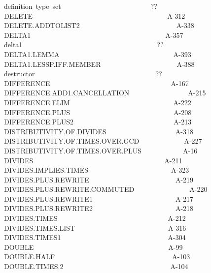 \documentclass[11pt]{book}
\newenvironment{pubasis}{\begin{flushleft}\ttfamily\small}{\normalsize\rmfamily\end{flushleft}}
\begin{document}
\begin{pubasis}
definition~type~set~~~~~~~~~~~~~~~~~~~~~~~~~~??\\
DELETE~~~~~~~~~~~~~~~~~~~~~~~~~~~~~~~~~~~~~~~A-312\\
DELETE.ADD\-TO\-LIST2~~~~~~~~~~~~~~~~~~~~~~~~~~~~A-338\\
DELTA1~~~~~~~~~~~~~~~~~~~~~~~~~~~~~~~~~~~~~~~A-357\\
delta1~~~~~~~~~~~~~~~~~~~~~~~~~~~~~~~~~~~~~~~??\\
DELTA1.LEMMA~~~~~~~~~~~~~~~~~~~~~~~~~~~~~~~~~A-393\\
DELTA1.LESSP.IFF.MEMBER~~~~~~~~~~~~~~~~~~~~~~A-388\\
destructor~~~~~~~~~~~~~~~~~~~~~~~~~~~~~~~~~~~??\\
DIFFERENCE~~~~~~~~~~~~~~~~~~~~~~~~~~~~~~~~~~~A-167\\
DIF\-FER\-ENCE.ADD1.CAN\-CELLATION~~~~~~~~~~~~~~~~~A-215\\
DIF\-FER\-ENCE.ELIM~~~~~~~~~~~~~~~~~~~~~~~~~~~~~~A-222\\
DIF\-FER\-ENCE.PLUS~~~~~~~~~~~~~~~~~~~~~~~~~~~~~~A-208\\
DIF\-FER\-ENCE.PLUS2~~~~~~~~~~~~~~~~~~~~~~~~~~~~~A-213\\
DIS\-TRI\-BU\-TIV\-ITY.OF.DIVIDES~~~~~~~~~~~~~~~~~~~~A-318\\
DIS\-TRI\-BU\-TIV\-ITY.OF.TIMES.OVER.GCD~~~~~~~~~~~~~A-227\\
DIS\-TRI\-BU\-TIV\-ITY.OF.TIMES.OVER.PLUS~~~~~~~~~~~~A-16\\
DIVIDES~~~~~~~~~~~~~~~~~~~~~~~~~~~~~~~~~~~~~~A-211\\
DIVIDES.IMPLIES.TIMES~~~~~~~~~~~~~~~~~~~~~~~~A-323\\
DIVIDES.PLUS.REWRITE~~~~~~~~~~~~~~~~~~~~~~~~~A-219\\
DIVIDES.PLUS.REWRITE.COMMUTED~~~~~~~~~~~~~~~~A-220\\
DIVIDES.PLUS.REWRITE1~~~~~~~~~~~~~~~~~~~~~~~~A-217\\
DIVIDES.PLUS.REWRITE2~~~~~~~~~~~~~~~~~~~~~~~~A-218\\
DIVIDES.TIMES~~~~~~~~~~~~~~~~~~~~~~~~~~~~~~~~A-212\\
DIVIDES.TIMES.LIST~~~~~~~~~~~~~~~~~~~~~~~~~~~A-316\\
DIVIDES.TIMES1~~~~~~~~~~~~~~~~~~~~~~~~~~~~~~~A-304\\
DOUBLE~~~~~~~~~~~~~~~~~~~~~~~~~~~~~~~~~~~~~~~A-99\\
DOUBLE.HALF~~~~~~~~~~~~~~~~~~~~~~~~~~~~~~~~~~A-103\\
DOUBLE.TIMES.2~~~~~~~~~~~~~~~~~~~~~~~~~~~~~~~A-104\\

\end{pubasis}
\end{document}
